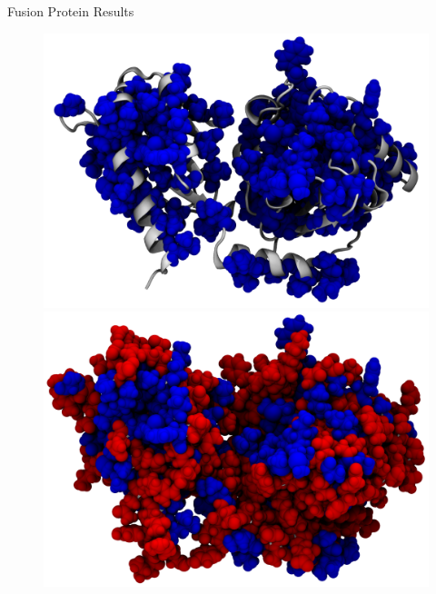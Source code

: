 \documentclass{beamer}
\begin{document}
\begin{frame}[t]
\begin{columns}[T,onlytextwidth]
\begin{column}{.48\linewidth}
{\begin{block}{Fusion Protein Results}
            \begin{figure}
                \begin{minipage}[]{0.45\linewidth}
                    \centering
                    \includegraphics[width=\textwidth]{figures/Complex_hydrophobic_core/hydrophobic_core_linker.png}
                \end{minipage}
            \hspace{0.5cm}
                \begin{minipage}[]{0.45\linewidth}
                    \centering
                    \includegraphics[width=\textwidth]{figures/Complex_hydrophobic_core/protein.png}
                \end{minipage}
            \end{figure}       



\end{block}}
\end{column}
\end{columns}
\end{frame}
\end{document}
